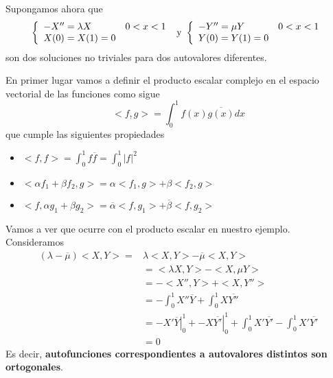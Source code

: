 Supongamos ahora que 
\begin{equation*}
\left\{
\begin{array}{l l}
-X''=\lambda X & 0<x<1\\
X(0)=X(1)=0
\end{array}
\right.
\text{ y }
\left\{
\begin{array}{l l}
-Y''=\mu Y & 0<x<1\\
Y(0)=Y(1)=0
\end{array}
\right.
\end{equation*}
son dos soluciones no triviales para dos autovalores diferentes.

En primer lugar vamos a definir el producto escalar complejo en el espacio vectorial de las funciones como sigue
$$<f,g> = \int_0^1f(x)\overline{g(x)}dx$$
que cumple las siguientes propiedades
\begin{itemize}
\item $<f,f> = \int_0^1f\overline{f}=\int_0^1|f|^2$
\item $<\alpha f_1+\beta f_2,g> = \alpha <f_1,g>+\beta<f_2,g>$
\item $<f, \alpha g_1+\beta g_2> = \overline{\alpha}<f,g_1>+\overline{\beta}<f,g_2>$
\end{itemize}
Vamos a ver que ocurre con el producto escalar en nuestro ejemplo. Consideramos
\begin{align*}
(\lambda-\overline{\mu})<X,Y> = & \lambda<X,Y>-\overline{\mu}<X,Y> \\
	& = <\lambda X, Y> - <X, \mu Y> \\
	& = -<X'',Y>+<X,Y''> \\
	& = -\int_0^1 X''\overline{Y}+\int_0^1X\overline{Y''}\\
	& = \left.-X'\overline{Y}\right|_0^1+ \left.-X\overline{Y'}\right|_0^1 + \int_0^1X'\overline{Y'} - \int_0^1X'\overline{Y'}\\
	& = 0
\end{align*}
Es decir, \textbf{autofunciones correspondientes a autovalores distintos son ortogonales}.

